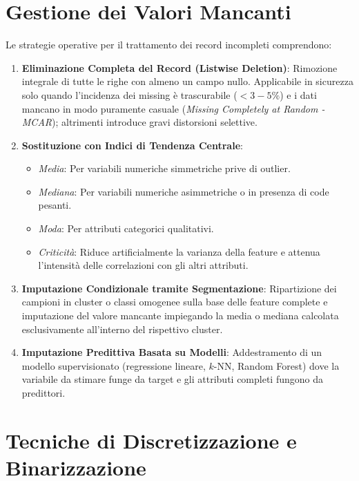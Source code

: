\section{Gestione dei Valori Mancanti}
\label{sec:dm-missing-values-handling}

Le strategie operative per il trattamento dei record incompleti comprendono:

\begin{enumerate}
    \item \textbf{Eliminazione Completa del Record (Listwise Deletion)}: Rimozione integrale di tutte le righe con almeno un campo nullo. Applicabile in sicurezza solo quando l'incidenza dei missing è trascurabile ($< 3-5\%$) e i dati mancano in modo puramente casuale (\textit{Missing Completely at Random - MCAR}); altrimenti introduce gravi distorsioni selettive.
    \item \textbf{Sostituzione con Indici di Tendenza Centrale}:
    \begin{itemize}[noitemsep]
        \item \textit{Media}: Per variabili numeriche simmetriche prive di outlier.
        \item \textit{Mediana}: Per variabili numeriche asimmetriche o in presenza di code pesanti.
        \item \textit{Moda}: Per attributi categorici qualitativi.
        \item \textit{Criticità}: Riduce artificialmente la varianza della feature e attenua l'intensità delle correlazioni con gli altri attributi.
    \end{itemize}
    \item \textbf{Imputazione Condizionale tramite Segmentazione}: Ripartizione dei campioni in cluster o classi omogenee sulla base delle feature complete e imputazione del valore mancante impiegando la media o mediana calcolata esclusivamente all'interno del rispettivo cluster.
    \item \textbf{Imputazione Predittiva Basata su Modelli}: Addestramento di un modello supervisionato (regressione lineare, $k$-NN, Random Forest) dove la variabile da stimare funge da target e gli attributi completi fungono da predittori.
\end{enumerate}

\section{Tecniche di Discretizzazione e Binarizzazione}
\label{sec:dm-discretization-binning}

